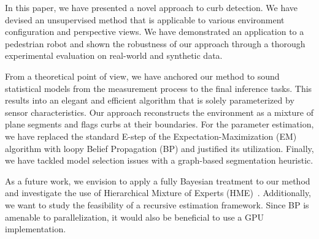 In this paper, we have presented a novel approach to curb detection. We have
devised an unsupervised method that is applicable to various environment
configuration and perspective views. We have demonstrated an application to a
pedestrian robot and shown the robustness of our approach through a thorough
experimental evaluation on real-world and synthetic data.

From a theoretical point of view, we have anchored our method to sound
statistical models from the measurement process to the final inference tasks.
This results into an elegant and efficient algorithm that is solely
parameterized by sensor characteristics. Our approach reconstructs the
environment as a mixture of plane segments and flags curbs at their boundaries.
For the parameter estimation, we have replaced the standard E-step of the
Expectation-Maximization (EM) algorithm with loopy Belief Propagation (BP) and
justified its utilization. Finally, we have tackled model selection issues with
a graph-based segmentation heuristic.

As a future work, we envision to apply a fully Bayesian treatment to our
method and investigate the use of Hierarchical Mixture of Experts
(HME)~\cite{bishop03bayesian}. Additionally, we want to study the feasibility of
a recursive estimation framework. Since BP is amenable to parallelization, it
would also be beneficial to use a GPU implementation.
